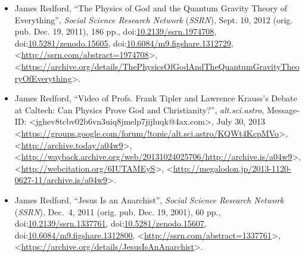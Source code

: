 \documentclass[letterpaper,12pt]{article}
\newcommand{\dsc}{\discretionary{}{}{}}
\begin{document}
\begin{itemize}
\small
\item James Redford, ``The Physics of God and the Quantum Gravity Theory of Everything'', \emph{Social Science Research Network} (\emph{SSRN}), Sept. 10, 2012 (orig. pub. Dec. 19, 2011), 186 pp., doi:\discretionary{}{}{}\href{http://dx.doi.org/10.2139/ssrn.1974708}{10.2139/\dsc ssrn.1974708}\thinspace , doi:\discretionary{}{}{}\href{http://dx.doi.org/10.5281/zenodo.15605}{10.5281/\dsc zenodo.15605}\thinspace , doi:\discretionary{}{}{}\href{http://dx.doi.org/10.6084/m9.figshare.1312729}{10.6084/\dsc m9.figshare.1312729}\thinspace , \textless\url{http://ssrn.com/abstract=1974708}\textgreater , \textless\href{https://archive.org/details/ThePhysicsOfGodAndTheQuantumGravityTheoryOfEverything}{\textsf{https\dsc :\dsc //\dsc archive.org/\dsc details/\dsc The\dsc Physics\dsc Of\dsc God\dsc And\dsc The\dsc Quantum\dsc Gravity\dsc Theory\dsc Of\dsc Everything}}\textgreater .

\item James Redford, ``Video of Profs. Frank Tipler and Lawrence Krauss's Debate at Caltech: Can Physics Prove God and Christianity?'', \emph{alt.sci.astro}, Message-ID: \textless\textsf{jghev8tcbv02b6vn3uiq8jmelp7jijluqk@4ax.com}\textgreater , July 30, 2013 \textless\href{https://groups.google.com/forum/#!topic/alt.sci.astro/KQWt4KcpMVo}{\textsf{https\dsc :\dsc //\dsc groups\dsc .\dsc google\dsc .\dsc com\dsc /\dsc forum\dsc /\dsc {\#}!topic\dsc /\dsc alt\dsc .\dsc sci\dsc .\dsc astro\dsc /\dsc KQWt4KcpMVo}}\textgreater , \textless\href{http://archive.today/a04w9}{\textsf{http\dsc :\dsc //\dsc archive\dsc .\dsc today\dsc /\dsc a04w9}}\textgreater , \textless\href{https://wayback.archive.org/web/20131024025706/http://archive.is/a04w9}{\textsf{http\dsc :\dsc //\dsc wayback\dsc .\dsc archive\dsc .\dsc org\dsc /\dsc web\dsc /\dsc 20131024025706\dsc /\dsc http\dsc :\dsc //\dsc archive\dsc .\dsc is\dsc /\dsc a04w9}}\textgreater , \textless\href{http://webcitation.org/6IUTAMEyS}{\textsf{http\dsc :\dsc //\dsc webcitation\dsc .\dsc org\dsc /\dsc 6IUTAMEyS}}\textgreater , \textless\href{http://megalodon.jp/2013-1120-0627-11/archive.is/a04w9}{\textsf{http\dsc :\dsc //\dsc megalodon\dsc .\dsc jp\dsc /\dsc 2013\dsc -\dsc 1120\dsc -\dsc 0627\dsc -\dsc 11\dsc /\dsc archive\dsc .\dsc is\dsc /\dsc a04w9}}\textgreater .

\item James Redford, ``Jesus Is an Anarchist'', \emph{Social Science Research Network} (\emph{SSRN}), Dec.~4, 2011 (orig. pub. Dec. 19, 2001), 60 pp., doi:\discretionary{}{}{}\href{http://dx.doi.org/10.2139/ssrn.1337761}{10.2139/\dsc ssrn.1337761}\thinspace , doi:\discretionary{}{}{}\href{http://dx.doi.org/10.5281/zenodo.15607}{10.5281/\dsc zenodo.15607}\thinspace , doi:\discretionary{}{}{}\href{http://dx.doi.org/10.6084/m9.figshare.1312800}{10.6084/\dsc m9.figshare.1312800}\thinspace , \textless\url{http://ssrn.com/abstract=1337761}\textgreater , \textless\href{https://archive.org/details/JesusIsAnAnarchist}{\textsf{https\dsc :\dsc //\dsc archive.org/\dsc details/\dsc Jesus\dsc Is\dsc An\dsc Anarchist}}\textgreater .


\end{itemize}
\end{document}
